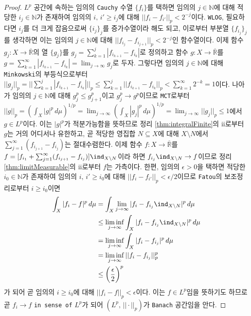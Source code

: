 \begin{proof}
    $L^p$ 공간에 속하는 임의의 \texttt{Cauchy} 수열 $\{f_i\}$를 택하면 임의의 $j\in\mathbb{N}$에 대해 적당한 $i_j\in\mathbb{N}$가 존재하여 임의의 $i,\,i'\geq i_j$에 대해 $||f_i-f_{i'}||_p<2^{-j}$이다. \texttt{WLOG}, 필요하다면 $i_j$를 더 크게 잡음으로써 $\{i_j\}_j$를 증가수열이라 해도 되고, 이로부터 부분열 $\{f_{i_j}\}_j$를 생각하면 이는 임의의 $j\in\mathbb{N}$에 대해 $||f_{i_j}-f_{i_{j+1}}||_p<2^{-j}$인 함수열이다. 이제 함수 $g_j:X\to\overline{\mathbb{R}}$의 열 $\{g_j\}$를 $g_j=\sum_{k=1}^j|f_{i_{k+1}}-f_{i_k}|$로 정의하고 함수 $g:X\to\overline{\mathbb{R}}$를 $g=\sum_{k=1}^\infty|f_{i_{k+1}}-f_{i_k}|=\lim_{j\to\infty}g_j$로 두자. 그렇다면 임의의 $j\in\mathbb{N}$에 대해 \texttt{Minkowski}의 부등식으로부터 $||g_j||_p=||\sum_{k=1}^j|f_{i_{k+1}}-f_{i_k}|||_p\leq\sum_{k=1}^j||f_{i_{k+1}}-f_{i_k}||_p<\sum_{k=1}^\infty 2^{-k}=1$이다. 나아가 임의의 $j\in\mathbb{N}$에 대해 $g_j^p\leq g_{j+1}^p$이고 $g_j^p\to g^p$이므로 \texttt{MCT}로부터 $||g||_p=(\int_X|g|^p\,d\mu)^{1/p}=\lim_{j\to\infty}(\int_X|g_j|^p\,d\mu)^{1/p}=\lim_{j\to\infty}||g_j||_p\leq1$에서 $g\in L^p$이다. 이는 $|g|^p$가 적분가능함을 뜻하므로 정리 \ref{thm:integralFinite}의 ii로부터 $g$는 거의 어디서나 유한하고, 곧 적당한 영집합 $N\subseteq X$에 대해 $X\setminus N$에서 $\sum_{j=1}^\infty(f_{i_{j+1}}-f_{i_j})$는 절대수렴한다. 이제 함수 $f:X\to\overline{\mathbb{R}}$를 $f=[f_{i_1}+\sum_{j=1}^\infty(f_{i_{j+1}}-f_{i_j})]\ind_{X\setminus N}$이라 하면 $f_{i_j}\ind_{X\setminus N}\to f$이므로 정리 \ref{thm:limitMeasurable}의 ii로부터 $f$는 가측이다. 한편, 임의의 $\epsilon>0$을 택하면 적당한 $i_0\in\mathbb{N}$가 존재하여 임의의 $i,\,i'\geq i_0$에 대해 $||f_i-f_{i'}||_p<\epsilon/2$이므로 \texttt{Fatou}의 보조정리로부터 $i\geq i_0$이면
    \begin{align*}
        \int_X|f_i-f|^p\,d\mu&=\int_X\lim_{j\to\infty}|f_i-f_{i_j}\ind_{X\setminus N}|^p\,d\mu\\
        &\leq\liminf_{j\to\infty}\int_X|f_i-f_{i_j}\ind_{X\setminus N}|^p\,d\mu\\
        &=\liminf_{j\to\infty}\int_X|f_i-f_{i_j}|^p\,d\mu\\
        &=\liminf_{j\to\infty}||f_i-f_{i_j}||_p^p\\
        &\leq\bigg(\frac{\epsilon}{2}\bigg)^p
    \end{align*}
    가 되어 곧 임의의 $i\geq i_0$에 대해 $||f_i-f||_p<\epsilon$이다. 이는 $f\in L^p$임을 뜻하기도 하므로 곧 $f_i\to f$ \texttt{in sense of} $L^p$가 되어 $(L^p,\,||\cdot||_p)$가 \texttt{Banach} 공간임을 안다.
\end{proof}

